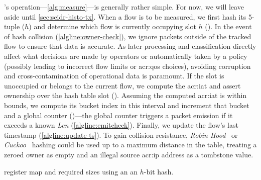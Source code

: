 \seidr{}'s operation---\cref{alg:measure}---is generally rather simple.
For now, we will leave aside  until \cref{sec:seidr-histo-tx}.
When a flow is to be measured, we first hash its 5-tuple ($h$) and determine which flow is currently occupying slot $h$ ().
In the event of hash collision (\cref{algline:owner-check}), we ignore packets outside of the tracked flow to ensure that data is accurate.
As later processing and classification directly affect what decisions are made by operators or automatically taken by a policy (possibly leading to incorrect flow limits or \gls{acr:qos} choices), avoiding corruption and cross-contamination of operational data is paramount.
If the slot is unoccupied or belongs to the current flow, we compute the \gls{acr:iat} and assert ownership over the hash table slot ().
Assuming the computed \gls{acr:iat} is within bounds, we compute its bucket index in this interval and increment that bucket and a global counter ()---the global counter triggers a packet emission if it exceeds a known \emph{Len} (\cref{algline:emitcheck}).
Finally, we update the flow's last timestamp (\cref{algline:update-ts}).
To gain collision resistance, \emph{Robin Hood}~\parencite{DBLP:conf/focs/CelisLM85} or \emph{Cuckoo}~\parencite{DBLP:conf/esa/PaghR01} hashing could be used up to a maximum distance in the table, treating a zeroed owner as empty and an illegal source \gls{acr:ip} address as a tombstone value.

\begin{table}
    \centering
    \caption{\seidr{} register map and required sizes using an an $h$-bit hash.}
    \label{tab:registers}
\end{table}


